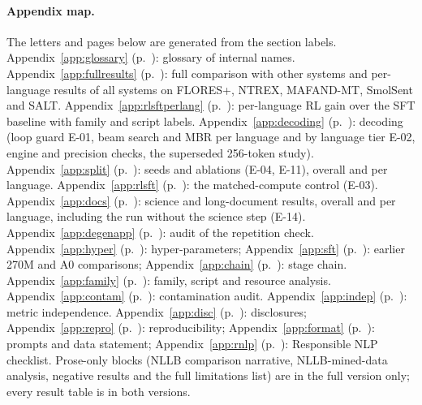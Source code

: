 \paragraph{Appendix map.} The letters and pages below are generated from the section labels. Appendix~\ref{app:glossary} (p.~\pageref{app:glossary}): glossary of internal names. Appendix~\ref{app:fullresults} (p.~\pageref{app:fullresults}): full comparison with other systems and per-language results of all systems on FLORES+, NTREX, MAFAND-MT, SmolSent and SALT. Appendix~\ref{app:rlsftperlang} (p.~\pageref{app:rlsftperlang}): per-language RL gain over the SFT baseline with family and script labels. Appendix~\ref{app:decoding} (p.~\pageref{app:decoding}): decoding (loop guard E-01, beam search and MBR per language and by language tier E-02, engine and precision checks, the superseded 256-token study). Appendix~\ref{app:split} (p.~\pageref{app:split}): seeds and ablations (E-04, E-11), overall and per language. Appendix~\ref{app:rlsft} (p.~\pageref{app:rlsft}): the matched-compute control (E-03). Appendix~\ref{app:docs} (p.~\pageref{app:docs}): science and long-document results, overall and per language, including the run without the science step (E-14). Appendix~\ref{app:degenapp} (p.~\pageref{app:degenapp}): audit of the repetition check. Appendix~\ref{app:hyper} (p.~\pageref{app:hyper}): hyper-parameters; Appendix~\ref{app:sft} (p.~\pageref{app:sft}): earlier 270M and A0 comparisons; Appendix~\ref{app:chain} (p.~\pageref{app:chain}): stage chain. Appendix~\ref{app:family} (p.~\pageref{app:family}): family, script and resource analysis. Appendix~\ref{app:contam} (p.~\pageref{app:contam}): contamination audit. Appendix~\ref{app:indep} (p.~\pageref{app:indep}): metric independence. Appendix~\ref{app:disc} (p.~\pageref{app:disc}): disclosures; Appendix~\ref{app:repro} (p.~\pageref{app:repro}): reproducibility; Appendix~\ref{app:format} (p.~\pageref{app:format}): prompts and data statement; Appendix~\ref{app:rnlp} (p.~\pageref{app:rnlp}): Responsible NLP checklist. Prose-only blocks (NLLB comparison narrative, NLLB-mined-data analysis, negative results and the full limitations list) are in the full version only; every result table is in both versions.

